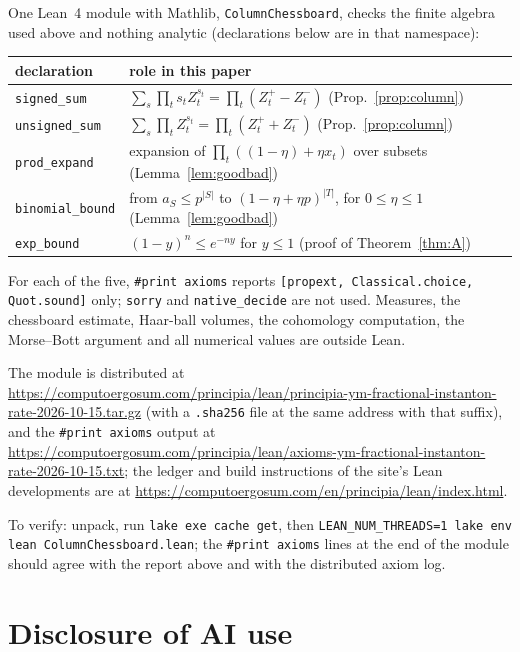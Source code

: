 \documentclass[11pt,a4paper]{article}
\theoremstyle{definition}
\theoremstyle{remark}
\newcommand{\code}[1]{\texttt{#1}}
\newcommand{\bundleurl}{https://computoergosum.com/principia/lean/principia-ym-fractional-instanton-rate-2026-10-15.tar.gz}
\newcommand{\axiomsurl}{https://computoergosum.com/principia/lean/axioms-ym-fractional-instanton-rate-2026-10-15.txt}
\begin{document}
One Lean~4 module with Mathlib, \code{ColumnChessboard}, checks the finite algebra used above and nothing analytic (declarations below are in that namespace):
\begin{center}\footnotesize
\begin{tabular}{lp{}}\toprule
declaration & role in this paper \\\midrule
\code{signed\_sum} & $\sum_s\prod_t s_t Z^{s_t}_t=\prod_t(Z^+_t-Z^-_t)$ (Prop.~\ref{prop:column}) \\
\code{unsigned\_sum} & $\sum_s\prod_t Z^{s_t}_t=\prod_t(Z^+_t+Z^-_t)$ (Prop.~\ref{prop:column}) \\
\code{prod\_expand} & expansion of $\prod_t((1-\eta)+\eta x_t)$ over subsets (Lemma~\ref{lem:goodbad}) \\
\code{binomial\_bound} & from $a_S\le p^{|S|}$ to $(1-\eta+\eta p)^{|T|}$, for $0\le\eta\le1$ (Lemma~\ref{lem:goodbad}) \\
\code{exp\_bound} & $(1-y)^n\le e^{-ny}$ for $y\le1$ (proof of Theorem~\ref{thm:A}) \\\bottomrule
\end{tabular}
\end{center}
For each of the five, \code{\#print axioms} reports \code{[propext, Classical.choice, Quot.sound]} only; \code{sorry} and \code{native\_decide} are not used.
Measures, the chessboard estimate, Haar-ball volumes, the cohomology computation, the Morse--Bott argument and all numerical values are outside Lean.
{\sloppy The module is distributed at \url{\bundleurl} (with a \code{.sha256} file at the same address with that suffix), and the \code{\#print axioms} output at \url{\axiomsurl}; the ledger and build instructions of the site's Lean developments are at \url{https://computoergosum.com/en/principia/lean/index.html}.\par}
To verify: unpack, run \code{lake exe cache get}, then \code{LEAN\_NUM\_THREADS=1 lake env lean ColumnChessboard.lean}; the \code{\#print axioms} lines at the end of the module should agree with the report above and with the distributed axiom log.

\section{Disclosure of AI use}\label{sec:ai}
\end{document}
